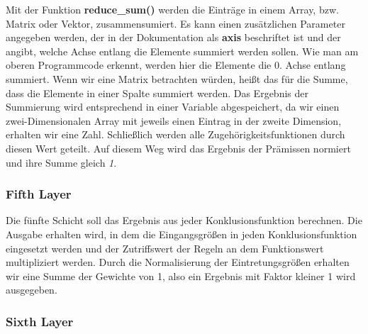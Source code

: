     Mit der Funktion \textbf{reduce\_sum()} werden die Einträge in einem
Array, bzw. Matrix oder Vektor, zusammensumiert. Es kann einen
zusätzlichen Parameter angegeben werden, der in der Dokumentation als
\textbf{axis} beschriftet ist und der angibt, welche Achse entlang die
Elemente summiert werden sollen. Wie man am oberen Programmcode erkennt,
werden hier die Elemente die 0. Achse entlang summiert. Wenn wir eine
Matrix betrachten würden, heißt das für die Summe, dass die Elemente in
einer Spalte summiert werden. Das Ergebnis der Summierung wird
entsprechend in einer Variable abgespeichert, da wir einen
zwei-Dimensionalen Array mit jeweils einen Eintrag in der zweite
Dimension, erhalten wir eine Zahl. Schließlich werden alle
Zugehörigkeitsfunktionen durch diesen Wert geteilt. Auf diesem Weg wird
das Ergebnis der Prämissen normiert und ihre Summe gleich \emph{1}.

\hypertarget{fifth-layer}{%
\subsubsection{Fifth Layer}\label{fifth-layer}}

Die fünfte Schicht soll das Ergebnis aus jeder Konklusionsfunktion
berechnen. Die Ausgabe erhalten wird, in dem die Eingangsgrößen in jeden
Konklusionsfunktion eingesetzt werden und der Zutriffswert der Regeln an
dem Funktionswert multipliziert werden. Durch die Normalisierung der
Eintretungsgrößen erhalten wir eine Summe der Gewichte von 1, also ein
Ergebnis mit Faktor kleiner 1 wird ausgegeben.


    \hypertarget{sixth-layer}{%
\subsubsection{Sixth Layer}\label{sixth-layer}}


